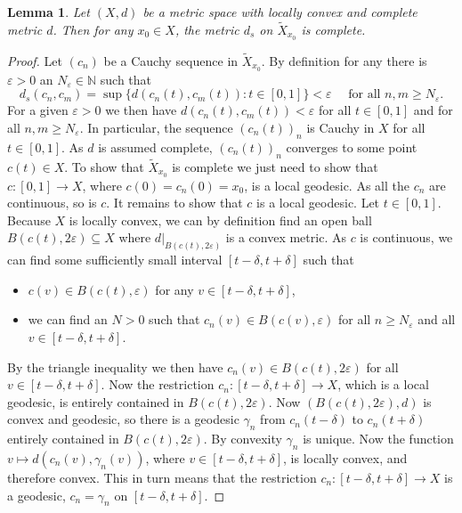 \documentclass[11pt, a4paper, oneside]{memoir}
\theoremstyle{plain}\newtheorem{theorem}[subsection]{Theorem}
\newtheorem{lemma}[subsection]{Lemma}
\theoremstyle{definition}
\newcommand{\twiddle}[1]{\widetilde{#1}}
\newcommand{\N}{\mathbb{N}}
\begin{document}
\begin{lemma}\label{lem:d_twiddle_complete}
    Let \((X,d)\) be a metric space with locally convex and complete metric \(d\). 
    Then for any \(x_0\in X\), the metric \(d_s\) on \(\twiddle{X}_{x_0}\) is complete.
\end{lemma}
\begin{proof}
    Let \((c_n)\) be a Cauchy sequence in \(\twiddle{X}_{x_0}\).
By definition for  any there is \(\varepsilon>0\) an \(N_\varepsilon\in\N\) such that
\[d_s(c_n,c_m)=\sup\{d(c_n(t),c_m(t)):t\in [0,1]\} < \varepsilon \quad\text{ for all }n,m\geq N_\varepsilon.\]
For a given \(\varepsilon>0\) we then have \(d(c_n(t),c_m(t))<\varepsilon\) for all \(t\in[0,1]\) and for all \(n,m\geq N_\varepsilon\).
In particular, the sequence \((c_n(t))_n\) is Cauchy in \(X\) for all \(t\in [0,1]\).
As \(d\) is assumed complete, \((c_n(t))_n\) converges to some point \(c(t)\in X\).
To show that \(\twiddle{X}_{x_0}\) is complete we just need to show that \(c:[0,1]\to X\), where \(c(0)=c_n(0)=x_0\), is a local geodesic.
As all the \(c_n\) are continuous, so is \(c\).
It remains to show that \(c\) is a local geodesic.
Let \(t\in [0,1]\).
Because \(X\) is locally convex, we can by definition find an open ball \(B(c(t),2\varepsilon)\subseteq X\) where \(d|_{B(c(t),2\varepsilon)}\) is a convex metric.
As \(c\) is continuous, we can find some sufficiently small interval \([t-\delta,t+\delta]\) such that
\begin{itemize}
    \item \(c(v)\in B(c(t),\varepsilon)\) for any \(v\in [t-\delta,t+\delta]\),
    \item we can find an \(N>0\) such that \(c_n(v)\in B(c(v),\varepsilon)\) for all \(n\geq N_\varepsilon\) and all \(v\in [t-\delta,t+\delta]\).
\end{itemize}
By the triangle inequality we then have \(c_n(v)\in B(c(t),2\varepsilon)\) for all \(v\in [t-\delta,t+\delta]\).
Now the restriction \(c_n:[t-\delta,t+\delta]\to X\), which is a local geodesic, is entirely contained in \(B(c(t),2\varepsilon)\).
Now \((B(c(t),2\varepsilon),d)\) is convex and geodesic, so there is a geodesic \(\gamma_n\) from \(c_n(t-\delta)\) to \(c_n(t+\delta)\) entirely contained in \(B(c(t),2\varepsilon)\).
By convexity \(\gamma_n\) is unique.
Now the function \(v\mapsto d(c_n(v),\gamma_n(v))\), where \(v\in [t-\delta,t+\delta]\), is locally convex, and therefore convex.
This in turn means that the restriction \(c_n:[t-\delta,t+\delta]\to X\) is a geodesic,  $c_n=\gamma_n$ on $[t-\delta,t+\delta]$.

\end{proof}
\end{document}
